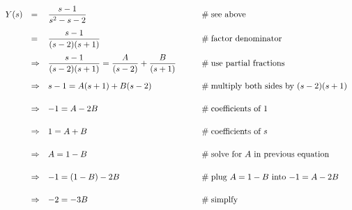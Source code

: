 \documentclass{article}
\theoremstyle{definition}
\begin{document}
\bigskip
\begin{equation*}
\begin{array}{lllll}
Y(s)                                                                                                                              
&=&  \mathlarger{\frac{s - 1}{s^2 -s -2}}                                                                                                                 &\qquad \mathrel{\#} \text{see above}                                            \\
[12pt]
&=& \mathlarger{\frac{s-1}{(s-2)(s+1)}}                                                                                                                  &\qquad \mathrel{\#} \text{factor denominator}                               \\
[12pt]
&\Rightarrow& \mathlarger{\frac{s-1}{(s-2)(s+1)}} =  \mathlarger{\frac{A}{(s-2)}} + \mathlarger{\frac{B}{(s+1)}}   &\qquad \mathrel{\#} \text{use partial fractions}                              \\
[15pt]
&\Rightarrow& s - 1 =  A (s + 1) + B (s - 2)                                                                                                            &\qquad \mathrel{\#} \text{multiply both sides by $(s - 2)(s + 1)$}   \\
[15pt]
&\Rightarrow& -1 = A - 2B                                                                                                                                      &\qquad \mathrel{\#} \text{coefficients of 1}                                    \\
[15pt]
&\Rightarrow& 1= A + B                                                                                                                                         &\qquad \mathrel{\#} \text{coefficients of $s$}                                 \\
[15pt]
&\Rightarrow& A = 1 -B                                                                                                                                          &\qquad \mathrel{\#} \text{solve for $A$ in previous equation}        \\
[15pt]
&\Rightarrow& -1 = (1 - B) - 2B                                                                                                                              &\qquad \mathrel{\#} \text{plug $A = 1 -B$ into $-1 = A - 2B$}        \\
[15pt]
&\Rightarrow& -2 = -3B                                                                                                                                          &\qquad \mathrel{\#} \text{simplfy}                                                  \\

\end{array}
\end{equation*}
\end{document}

